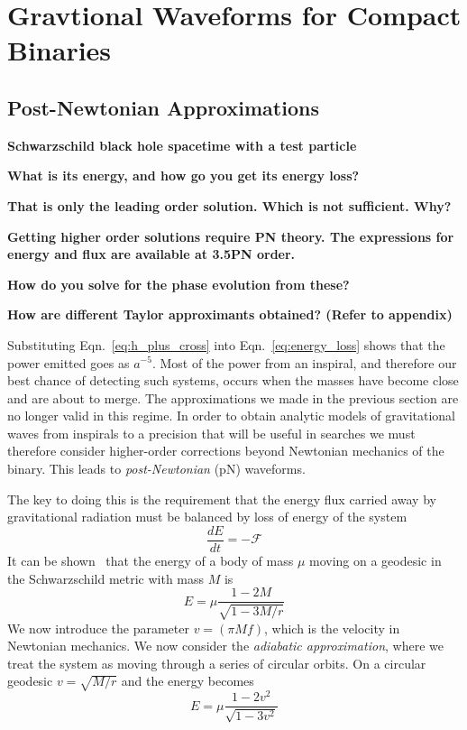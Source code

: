 \section{Gravtional Waveforms for Compact Binaries}
\subsection{Post-{N}ewtonian Approximations}
\label{sec:PNWaveforms}


{\bf Schwarzschild black hole spacetime with a test particle}

{\bf What is its energy, and how go you get its energy loss?}

{\bf That is only the leading order solution. Which is not sufficient. Why? }

{\bf Getting higher order solutions require PN theory. The expressions for 
energy and flux are available at 3.5PN order. }

{\bf How do you solve for the phase evolution from these? }

{\bf How are different Taylor approximants obtained?
(Refer to appendix)}

Substituting Eqn.~\ref{eq:h_plus_cross} into
Eqn.~\ref{eq:energy_loss} shows that the power emitted goes as
$a^{-5}$.  Most of the power from an inspiral, and therefore our best
chance of detecting such systems, occurs when the masses have become
close and are about to merge.  The approximations we made in the
previous section are no longer valid in this regime.  In order to
obtain analytic models of gravitational waves from inspirals to a
precision that will be useful in searches we must therefore consider
higher-order corrections beyond Newtonian mechanics of the binary.
This leads to \emph{post-Newtonian} (pN) waveforms.

The key to doing this is the requirement that the energy flux carried
away by gravitational radiation must be balanced by loss of energy of the
system
%
\begin{equation}
\label{eq:equivilent_exchange}
\frac{dE}{dt} = - \mathcal{F}
\end{equation}
%
It can be shown~\cite{mtw} that the energy of a body of mass $\mu$ moving
on a geodesic in the Schwarzschild metric with mass $M$ is
%
\begin{equation}
\label{eq:hamiltonian}
E = \mu \frac{1-2M}{\sqrt{1-3M/r}} 
\end{equation}
%
We now introduce the parameter $v = (\pi M f)$, which is the velocity
in Newtonian mechanics.  We now consider the \emph{adiabatic
approximation}, where we treat the system as moving through a series
of circular orbits.  On a circular geodesic $v= \sqrt{M/r}$ and the
energy becomes
%
\begin{equation}
E = \mu \frac{1-2v^2}{\sqrt{1-3v^2}} 
\end{equation}


